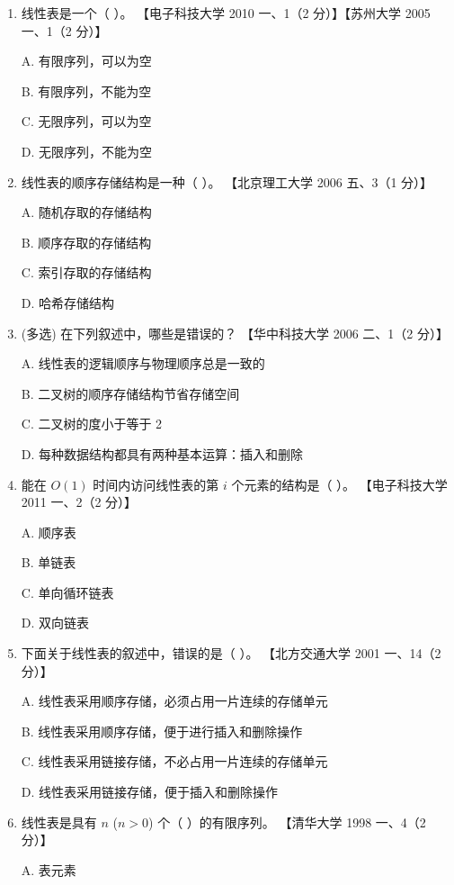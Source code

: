 \documentclass[lang=cn,newtx,10pt,scheme=chinese]{../../elegantbook}
\begin{document}
\begin{enumerate}
    \item 线性表是一个（ ）。  
    【电子科技大学 2010 一、1（2 分）】【苏州大学 2005 一、1（2 分）】  

    A. 有限序列，可以为空  

    B. 有限序列，不能为空  

    C. 无限序列，可以为空  

    D. 无限序列，不能为空  

    \item 线性表的顺序存储结构是一种（ ）。  
    【北京理工大学 2006 五、3（1 分）】  

    A. 随机存取的存储结构  

    B. 顺序存取的存储结构  

    C. 索引存取的存储结构  

    D. 哈希存储结构  


    \item (多选) 在下列叙述中，哪些是错误的？  
    【华中科技大学 2006 二、1（2 分）】 

    A. 线性表的逻辑顺序与物理顺序总是一致的  

    B. 二叉树的顺序存储结构节省存储空间  

    C. 二叉树的度小于等于 2  

    D. 每种数据结构都具有两种基本运算：插入和删除  

    \item 能在 $O(1)$ 时间内访问线性表的第 $i$ 个元素的结构是（ ）。  
    【电子科技大学 2011 一、2（2 分）】  

    A. 顺序表  

    B. 单链表  

    C. 单向循环链表  

    D. 双向链表  

    \item 下面关于线性表的叙述中，错误的是（ ）。  
    【北方交通大学 2001 一、14（2 分）】  

    A. 线性表采用顺序存储，必须占用一片连续的存储单元  

    B. 线性表采用顺序存储，便于进行插入和删除操作  

    C. 线性表采用链接存储，不必占用一片连续的存储单元  

    D. 线性表采用链接存储，便于插入和删除操作  

    \item 线性表是具有 $n$ ($n > 0$) 个（ ）的有限序列。  
    【清华大学 1998 一、4（2 分）】  

    A. 表元素  


\end{enumerate}
\end{document}
